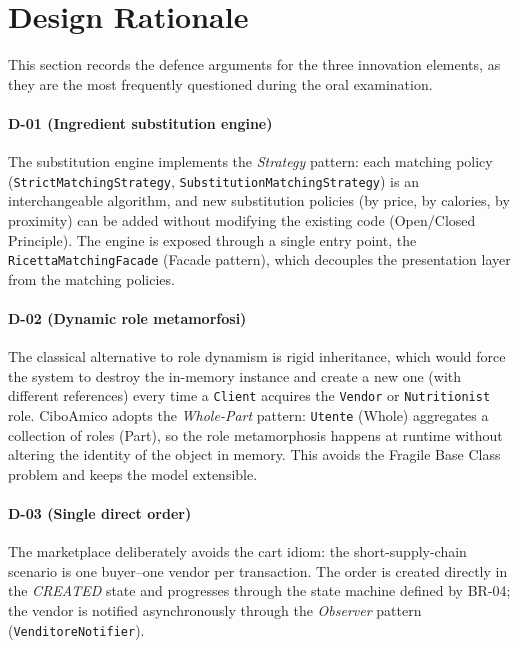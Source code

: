 \section{Design Rationale}

This section records the defence arguments for the three innovation
elements, as they are the most frequently questioned during the oral
examination.

\paragraph{D-01 (Ingredient substitution engine)} The substitution engine
implements the \emph{Strategy} pattern: each matching policy
(\texttt{StrictMatchingStrategy}, \texttt{SubstitutionMatchingStrategy}) is
an interchangeable algorithm, and new substitution policies (by price, by
calories, by proximity) can be added without modifying the existing code
(Open/Closed Principle). The engine is exposed through a single entry
point, the \texttt{RicettaMatchingFacade} (Facade pattern), which decouples
the presentation layer from the matching policies.

\paragraph{D-02 (Dynamic role metamorfosi)} The classical alternative to
role dynamism is rigid inheritance, which would force the system to
destroy the in-memory instance and create a new one (with different
references) every time a \texttt{Client} acquires the \texttt{Vendor} or
\texttt{Nutritionist} role. CiboAmico adopts the \emph{Whole-Part} pattern:
\texttt{Utente} (Whole) aggregates a collection of roles (Part), so the
role metamorphosis happens at runtime without altering the identity of
the object in memory. This avoids the Fragile Base Class problem and
keeps the model extensible.

\paragraph{D-03 (Single direct order)} The marketplace deliberately
avoids the cart idiom: the short-supply-chain scenario is one
buyer--one vendor per transaction. The order is created directly in the
\emph{CREATED} state and progresses through the state machine defined by
BR-04; the vendor is notified asynchronously through the
\emph{Observer} pattern (\texttt{VenditoreNotifier}).
